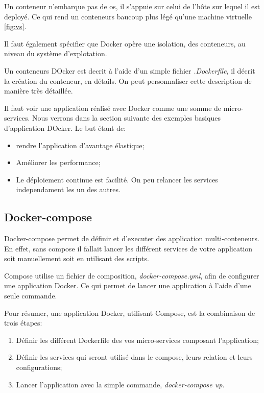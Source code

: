 Un conteneur n'embarque pas de \gls{os}, il s'appuie sur celui de l'hôte sur lequel il est deployé. Ce qui rend un conteneurs baucoup plus légé qu'une machine virtuelle \ref{fig:vs}.

Il faut également spécifier que Docker opère une isolation, des conteneurs, au niveau du système d'explotation. 

Un conteneurs DOcker est decrit à l'aide d'un simple fichier \emph{.Dockerfile}, il décrit la création du conteneur, en détails. On peut personnaliser cette description de manière très détaillée. 

Il faut voir une application réalisé avec Docker comme une somme de micro-services. Nous verrons dans la section suivante des exemples basiques d'application DOcker. Le but étant de:

\begin{itemize}
\item rendre l'application d'avantage élastique;
\item Améliorer les performance;
\item Le déploiement continue est facilité. On peu relancer les services independament les un des autres.
\end{itemize}


\subsection{Docker-compose}
Docker-compose permet de définir et d'executer des application multi-conteneurs. En effet, sans compose il fallait lancer les différent services de votre application soit manuellement soit en utilisant des scripts.

Compose utilise un fichier de composition, \emph{docker-compose.yml}, afin de configurer une application Docker. Ce qui permet de lancer une application à l'aide d'une seule commande. 

Pour résumer, une application Docker, utilisant Compose, est la combinaison de trois étapes:

\begin{enumerate}
\item Définir les différent Dockerfile des vos micro-services composant l'application;
\item Définir les services qui seront utilisé dans le compose, leurs relation et leurs configurations;
\item Lancer l'application avec la simple commande, \emph{docker-compose up}.
\end{enumerate}


